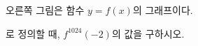 \noindent\begin{minipage}[t]{0.58\linewidth}\vspace{0pt}\raggedright 오른쪽 그림은 함수 $y=f(x)$의 그래프이다. \par\smallskip\end{minipage}\hfill\begin{minipage}[t]{0.4\linewidth}\vspace{0pt}\centering \resizebox{\ifdim\width>\linewidth\linewidth\else\width\fi}{!}{}\end{minipage}\par
\noindent {}\par{}\par\smallskip\noindent 로 정의할 때, $f^{1024}(-2)$의 값을 구하시오.
